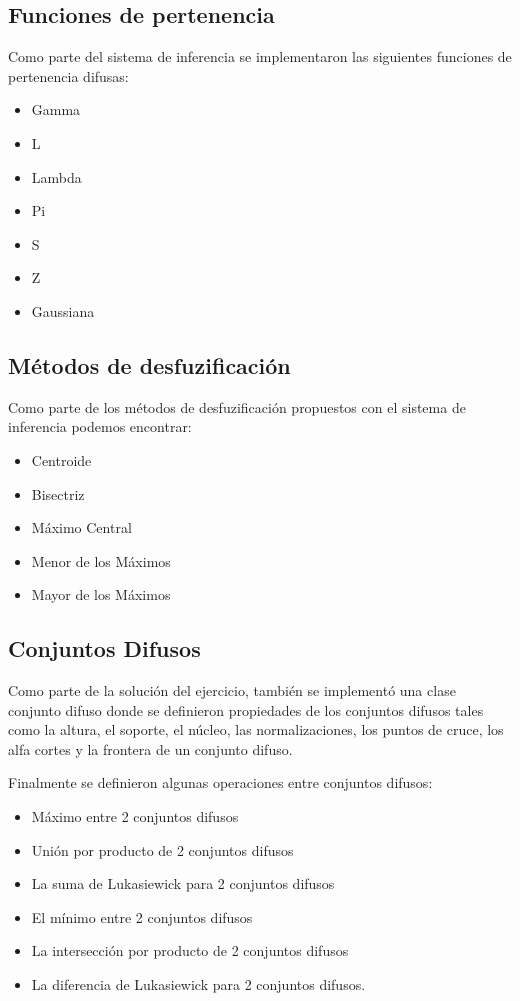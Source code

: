 \documentclass[a4paper,10pt,twocolumn]{article}
\begin{document}
	\subsection{Funciones de pertenencia}
	Como parte del sistema de inferencia se implementaron las siguientes funciones de pertenencia difusas:
	
	\begin{itemize}
		\item Gamma
		\item L
		\item Lambda
		\item Pi
		\item S
		\item Z
		\item Gaussiana
	\end{itemize}

	\subsection{Métodos de desfuzificación}
	Como parte de los métodos de desfuzificación propuestos con el sistema de inferencia podemos encontrar:
	
	\begin{itemize}
		\item Centroide
		\item Bisectriz
		\item Máximo Central
		\item Menor de los Máximos
		\item Mayor de los Máximos
	\end{itemize}

	\subsection{Conjuntos Difusos}
	Como parte de la solución del ejercicio, también se implementó una clase conjunto difuso donde se definieron propiedades de los conjuntos difusos tales como la altura, el soporte, el núcleo, las normalizaciones, los puntos de cruce, los alfa cortes y la frontera de un conjunto difuso.
	
	Finalmente se definieron algunas operaciones entre conjuntos difusos:
	
	\begin{itemize}
		\item Máximo entre 2 conjuntos difusos
		\item Unión por producto de 2 conjuntos difusos
		\item La suma de Lukasiewick para 2 conjuntos difusos
		\item El mínimo entre 2 conjuntos difusos
		\item La intersección por producto de 2 conjuntos difusos
		\item La diferencia de Lukasiewick para 2 conjuntos difusos.
	\end{itemize}
\end{document}
